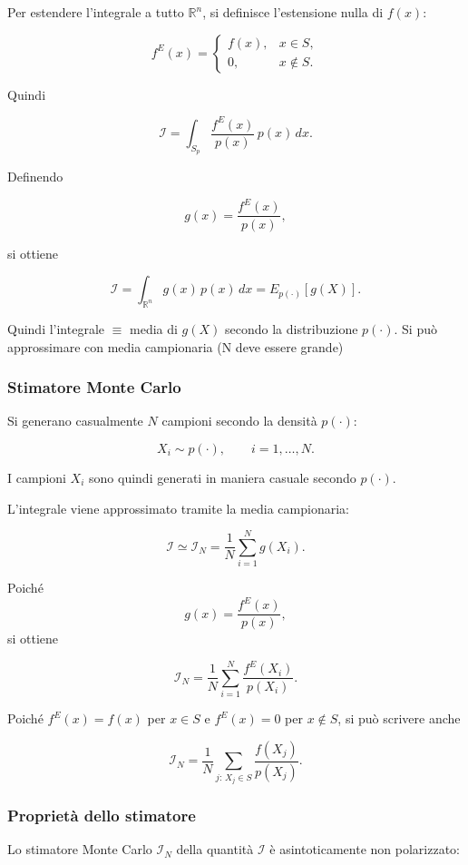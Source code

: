 \documentclass[11pt,a4paper]{article}
\begin{document}
Per estendere l'integrale a tutto \(\mathbb{R}^n\), si definisce l'estensione nulla di \(f(x)\):

\[
f^E(x)=
\begin{cases}
f(x), & x\in S,\\[0.3em]
0, & x\notin S.
\end{cases}
\]

Quindi

\[
\mathcal{I}
=
\int_{S_p}
\frac{f^E(x)}{p(x)}\,p(x)\,dx.
\]

Definendo

\[
g(x)=\frac{f^E(x)}{p(x)},
\]

si ottiene

\[
\mathcal{I}
=
\int_{\mathbb{R}^n} g(x)\,p(x)\,dx
=
E_{p(\cdot)}[g(X)].
\]

Quindi l'integrale $\equiv$ media di \(g(X)\) secondo la distribuzione \(p(\cdot)\).
Si può approssimare con media campionaria (N deve essere grande)

\subsubsection*{Stimatore Monte Carlo}

Si generano casualmente \(N\) campioni secondo la densità \(p(\cdot)\):

\[
X_i \sim p(\cdot),
\qquad
i=1,\dots,N.
\]

I campioni \(X_i\) sono quindi generati in maniera casuale secondo \(p(\cdot)\).

L'integrale viene approssimato tramite la media campionaria:

\[
\mathcal{I}
\simeq
\mathcal{I}_N
=
\frac{1}{N}\sum_{i=1}^{N} g(X_i).
\]

Poiché
\[
g(x)=\frac{f^E(x)}{p(x)},
\]
si ottiene

\[
\mathcal{I}_N
=
\frac{1}{N}\sum_{i=1}^{N}
\frac{f^E(X_i)}{p(X_i)}.
\]

Poiché \(f^E(x)=f(x)\) per \(x\in S\) e \(f^E(x)=0\) per \(x\notin S\), si può scrivere anche

\[
\mathcal{I}_N
=
\frac{1}{N}
\sum_{j:\,X_j\in S}
\frac{f(X_j)}{p(X_j)}.
\]

\subsubsection*{Proprietà dello stimatore}

Lo stimatore Monte Carlo \(\mathcal{I}_N\) della quantità \(\mathcal{I}\) è asintoticamente non polarizzato:
\end{document}
